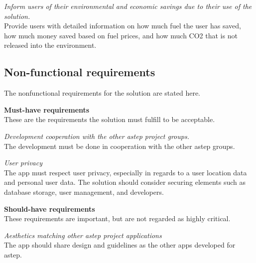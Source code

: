 \textit{Inform users of their environmental and economic savings due to their use of the solution.}\\
Provide users with detailed information on how much fuel the user has saved, how much money saved based on fuel prices, and how much CO2 that is not released into the environment. 

\subsection{Non-functional requirements}
The nonfunctional requirements for the solution are stated here.

\textbf{Must-have requirements}\\
These are the requirements the solution must fulfill to be acceptable.

\textit{Development cooperation with the other \gls{astep} project groups.}\\
The development must be done in cooperation with the other \gls{astep} groups.

\textit{User privacy}\\
The app must respect user privacy, especially in regards to a user location data and personal user data.
The solution should consider securing elements such as database storage, user management, and developers.

\textbf{Should-have requirements}\\
These requirements are important, but are not regarded as highly critical.

\textit{Aesthetics matching other \gls{astep} project applications}\\
The app should share design and guidelines as the other apps developed for \gls{astep}.